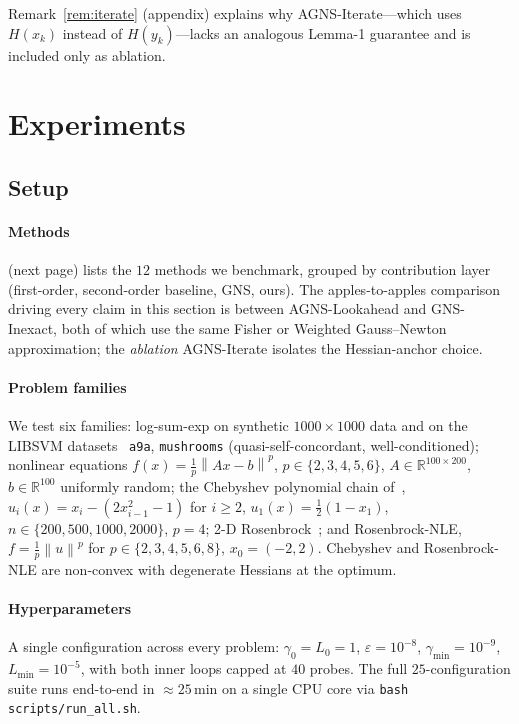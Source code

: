 \documentclass[conference]{IEEEtran}
\theoremstyle{remark}
\newcommand{\R}{\mathbb{R}}
\newcommand{\norm}[1]{\left\lVert#1\right\rVert}
\newcommand{\AGNS}{\textsc{AGNS}}
\newcommand{\GNS}{\textsc{GNS}}
\begin{document}
Remark~\ref{rem:iterate} (appendix) explains why \AGNS-Iterate---which uses
$H(x_k)$ instead of $H(y_k)$---lacks an analogous Lemma-1 guarantee
and is included only as ablation.

\section{Experiments}
\label{sec:experiments}

\subsection{Setup}

\paragraph{Methods}
 (next page) lists the $12$ methods we benchmark,
grouped by contribution layer (first-order, second-order baseline,
\GNS, ours). The apples-to-apples comparison driving every claim in
this section is between \AGNS-Lookahead and \GNS-Inexact, both of
which use the same Fisher or Weighted Gauss--Newton approximation;
the \emph{ablation} \AGNS-Iterate isolates the Hessian-anchor choice.

\paragraph{Problem families}
We test six families: log-sum-exp on synthetic $1000{\times}1000$
data and on the LIBSVM datasets~\cite{chang2011libsvm} \texttt{a9a},
\texttt{mushrooms} (quasi-self-concordant, well-conditioned);
nonlinear equations $f(x) = \tfrac{1}{p}\norm{Ax{-}b}^p$,
$p\in\{2,3,4,5,6\}$, $A \in \R^{100\times 200}$, $b \in \R^{100}$
uniformly random; the Chebyshev polynomial chain
of~\cite{semenov2025gradient}, $u_i(x) = x_i - (2x_{i-1}^2 - 1)$ for
$i\ge 2$, $u_1(x) = \tfrac12(1{-}x_1)$, $n\in\{200,500,1000,2000\}$,
$p=4$; 2-D Rosenbrock~\cite{rosenbrock1960automatic}; and
Rosenbrock-NLE, $f = \tfrac{1}{p}\norm{u}^p$ for
$p\in\{2,3,4,5,6,8\}$, $x_0 = (-2,2)$. Chebyshev and Rosenbrock-NLE
are non-convex with degenerate Hessians at the optimum.

\paragraph{Hyperparameters}
A single configuration across every problem: $\gamma_0 = L_0 = 1$,
$\varepsilon = 10^{-8}$, $\gamma_{\min} = 10^{-9}$,
$L_{\min} = 10^{-5}$, with both inner loops capped at $40$ probes.
The full $25$-configuration suite runs end-to-end in $\approx 25$\,min
on a single CPU core via \texttt{bash scripts/run\_all.sh}.
\end{document}
